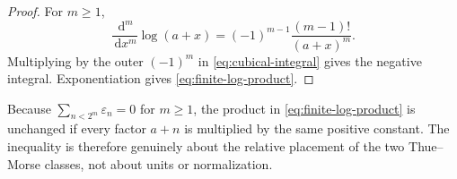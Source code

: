 \documentclass[11pt,oneside]{article}
\theoremstyle{definition}
\theoremstyle{remark}
\newcommand{\dd}{\,\mathrm d}
\begin{document}
\begin{proof}
For $m\ge1$,
\[
 \frac{\dd^m}{\dd x^m}\log(a+x)
 =(-1)^{m-1}\frac{(m-1)!}{(a+x)^m}.
\]
Multiplying by the outer $(-1)^m$ in
\eqref{eq:cubical-integral} gives the negative integral.  Exponentiation gives
\eqref{eq:finite-log-product}.
\end{proof}

Because $\sum_{n<2^m}\varepsilon_n=0$ for $m\ge1$, the product in
\eqref{eq:finite-log-product} is unchanged if every factor $a+n$ is multiplied
by the same positive constant.  The inequality is therefore genuinely about
the relative placement of the two Thue--Morse classes, not about units or
normalization.
\end{document}

